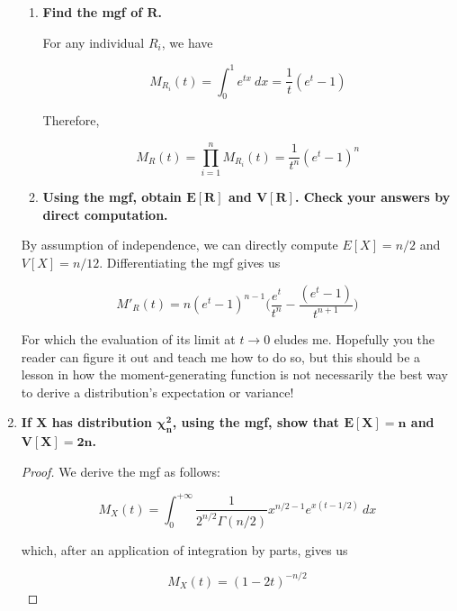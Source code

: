 \documentclass[10pt, oneside]{article}   	%
\theoremstyle{definition}
\begin{document}
\begin{enumerate}[label=10.\arabic*]
	\begin{enumerate}
	\item  \begin{tcolorbox}[
	  colback=Cerulean!5!white,
	  colframe=Cerulean!75!black]
	\textbf{Find the mgf of $\bm{R}$.}
	\end{tcolorbox}
	
	For any individual $R_i$, we have
	
	\[ M_{R_i} (t) = \int^1_0 e^{tx} \ dx = \frac{1}{t} (e^t - 1) \]
	
	Therefore,
	
	\[ M_R(t) = \prod^n_{i=1} M_{R_i}(t) = \boxed{ \frac{1}{t^n} (e^t - 1)^n } \]
	
	\item  \begin{tcolorbox}[
	  colback=Cerulean!5!white,
	  colframe=Cerulean!75!black]
	\textbf{Using the mgf, obtain $\bm{E[R]}$ and $\bm{V[R]}$. Check your answers by direct computation.}
	\end{tcolorbox}
	\end{enumerate}
	
	By assumption of independence, we can directly compute $\boxed{E[X] = n/2}$ and $\boxed{V[X] = n/12}$. Differentiating the mgf gives us
	
	\[ M'_R(t) = n (e^t - 1)^{n-1} \bigg( \frac{e^t}{t^n} - \frac{(e^t - 1)}{t^{n+1}} \bigg) \]
	
	For which the evaluation of its limit at $t \rightarrow 0$ eludes me. Hopefully you the reader can figure it out and teach me how to do so, but this should be a lesson in how the moment-generating function is not necessarily the best way to derive a distribution's expectation or variance!

\item  \begin{tcolorbox}[
  colback=Cerulean!5!white,
  colframe=Cerulean!75!black]
\textbf{If $\bm{X}$ has distribution $\bm{\chi^2_n}$, using the mgf, show that $\bm{E[X] = n}$ and $\bm{V[X] = 2n}$.}
\end{tcolorbox}

\begin{proof}
We derive the mgf as follows:

\[ M_X(t) = \int^{+\infty}_0 \frac{1}{2^{n/2} \Gamma (n/2)} x^{n/2-1} e^{x(t-1/2)} \ dx \]

which, after an application of integration by parts, gives us

\[ M_X(t) = (1-2t)^{-n/2} \]


\end{proof}
\end{enumerate}
\end{document}
